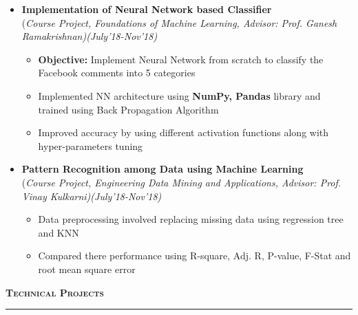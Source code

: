 \documentclass[a4paper,10pt]{article}
\newcommand{\isep}{-2 pt}
\newcommand{\lsep}{-0.5cm}
\newcommand{\resheading}[1]{{\small
        {
            \begin{minipage}
                {0.992\textwidth}\textbf{{\textsc{#1 \vphantom{p\^{E}} }}}
                \\[-0.3cm]
                \hrule
            \end{minipage}
            \\[-0.5cm]
        }
 }}
\begin{document}
\begin{itemize}
\item \textbf{Implementation of Neural Network based Classifier} \\ 
(\emph{Course Project, Foundations of Machine Learning, Advisor: Prof. Ganesh Ramakrishnan)\hfill (July'18-Nov'18)}
    \\ [-0.6cm]
    \begin{itemize}\itemsep \isep
   \item \textbf{Objective:} Implement Neural Network from scratch to classify the Facebook comments into 5 categories %
    \item Implemented NN architecture using \textbf{NumPy, Pandas} library and trained using Back Propagation Algorithm
    \item Improved accuracy by using different activation functions along with hyper-parameters tuning
\end{itemize}

\item \textbf{Pattern Recognition among Data using Machine Learning}\\ 
(\emph{Course Project, Engineering Data Mining and Applications, Advisor: Prof. Vinay Kulkarni)\hfill (July'18-Nov'18)}
\\[-0.6cm]
    \begin{itemize}\itemsep \isep
    \item Data preprocessing involved replacing missing data using regression tree
    and KNN 
    \item  Compared there performance using R-square, Adj. R, P-value, F-Stat and root mean square error
    \end{itemize}
\end{itemize}
\resheading{\textbf{\large Technical Projects}}\\[\lsep] 
\\ [-0.2cm]
\end{document}
